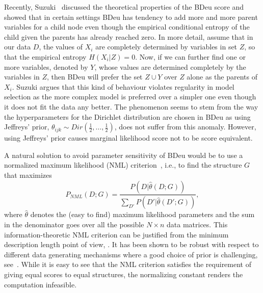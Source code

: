 Recently, Suzuki~\cite{Suzuki2017} discussed the theoretical
properties of the BDeu score and showed that in certain settings BDeu
has tendency to add more and more parent variables for a child node
even though the empirical conditional entropy of the child given the
parents has already reached zero. In more detail, assume that in our
data $D$, the values of $X_i$ are completely determined by variables
in set $Z$, so that the empirical entropy $H(X_i | Z) = 0$. Now, if we can further
find one or more variables, denoted by $Y$, whose values are
determined completely by the variables in $Z$, then BDeu will prefer
the set $Z\cup Y$ over $Z$ alone as the parents of $X_i$. Suzuki
argues that this kind of behaviour violates regularity in model
selection as the more complex model is preferred over a simpler one
even though it does not fit the data any better. The phenomenon seems
to stem from the way the hyperparameters for the Dirichlet
distribution are chosen in BDeu as using Jeffreys' prior,
$\theta_{ijk}\sim Dir(\frac{1}{2},\ldots,\frac{1}{2})$, does not suffer
from this anomaly. However, using Jeffreys' prior causes marginal
likelihood score not to be score equivalent.

A natural solution to avoid parameter sensitivity of BDeu would be to
use a normalized maximum likelihood (NML)
criterion~\cite{Shta87,Riss96a}, i.e., to find the structure $G$ that
maximizes
\begin{equation}
P_{NML}(D;G)=\frac{P(D|\hat\theta(D;G))}{\sum_{D'}{P(D'|\hat\theta(D';G))}},
\end{equation}
where $\hat\theta$ denotes the (easy to find) maximum likelihood
parameters and the sum in the denominator goes over all the possible
$N\times n$ data matrices. This information-theoretic NML criterion
can be justified from the minimum description length point of view,
\cite{Riss78,Grun07}. It has been shown to be robust with respect to
different data generating mechanisms where a good choice of prior
is challenging, see~\cite{eggeling2014robust,maatta16}. While it is
easy to see that the NML criterion satisfies the requirement of giving
equal scores to equal structures, the normalizing constant renders the
computation infeasible.


